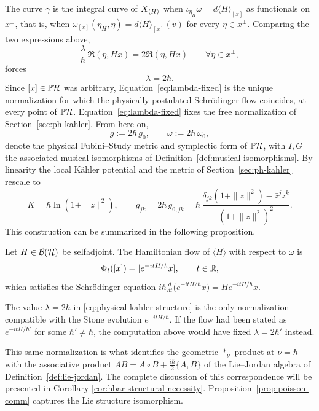 \noindent The curve $\gamma$ is the integral curve of $X_{\langle H\rangle}$ when $\iota_{\eta_H}\omega=d\langle H\rangle_{[x]}$ as functionals on $x^\perp$, that is, when $\omega_{[x]}(\eta_H,\eta)=d\langle H\rangle_{[x]}(v)$ for every $\eta\in x^\perp$. Comparing the two expressions above,
\[
\frac\lambda\hbar\,\Re(\eta,Hx)=2\Re(\eta,Hx)\qquad \forall \eta\in x^\perp,
\]
forces
\begin{equation}
	\lambda=2\hbar. \label{eq:lambda-fixed}
\end{equation}
Since $[x]\in\PH$ was arbitrary, Equation~\eqref{eq:lambda-fixed} is the unique normalization for which the physically postulated Schrödinger flow coincides, at every point of $\PH$. Equation~\eqref{eq:lambda-fixed} fixes the free normalization of
Section~\ref{sec:ph-kahler}. From here on,
\begin{equation}
	g:=2\hbar\,g_0, \qquad \omega:=2\hbar\,\omega_0, \label{eq:physical-kahler-structure}
\end{equation}
denote the physical Fubini--Study metric and symplectic form of $\PH$,
with $I,G$ the associated musical isomorphisms of
Definition~\ref{def:musical-isomorphisms}. By linearity the local Kähler potential and the metric
of Section~\ref{sec:ph-kahler} rescale to
\[
K=\hbar\ln(1+\|z\|^2), \qquad
g_{j\bar k}=2\hbar\,g_{0,j\bar k}=\hbar\,\frac{\delta_{jk}(1+\|z\|^2)-\bar z^jz^k}{(1+\|z\|^2)^2}.
\]
This construction can be summarized in the following proposition.

\begin{proposition}
	\label{prop:hamiltonian-schrodinger}
	Let $H\in\BH$ be selfadjoint. The Hamiltonian flow of $\langle H\rangle$ with respect to $\omega$ is
	\[
	\Phi_t([x])=[e^{-itH/\hbar}x], \qquad t\in\mathbb{R},
	\]
	which satisfies the Schrödinger equation
	$i\hbar\frac{d}{dt}\big(e^{-itH/\hbar}x\big)=He^{-itH/\hbar}x$.
\end{proposition}


\begin{remark}
	The value $\lambda=2\hbar$ in \eqref{eq:physical-kahler-structure} is the only normalization compatible with the Stone evolution $e^{-itH/\hbar}$. If the flow had been stated as $e^{-itH/\hbar'}$ for some $\hbar'\neq\hbar$, the computation above would have fixed $\lambda=2\hbar'$ instead.
\end{remark}

\noindent This same normalization is what identifies the geometric $*_{\nu}$
product at $\nu=\hbar$ with the associative product
$AB=A\circ B+\tfrac{i\hbar}{2}\{A,B\}$ of the Lie--Jordan algebra
of Definition~\ref{def:lie-jordan}. The complete discussion of this correspondence will be presented in Corollary \ref{cor:hbar-structural-necessity}. Proposition~\ref{prop:poisson-comm} captures the Lie structure isomorphism.

